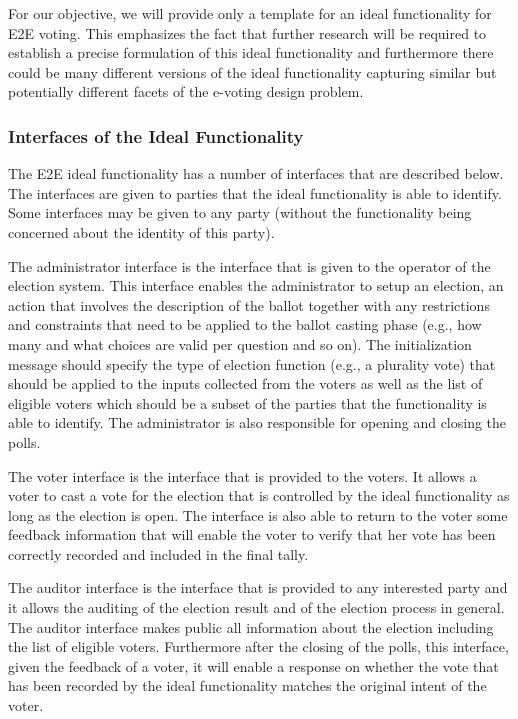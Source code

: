 For our objective, we will provide only a template for an ideal
functionality for E2E voting. This emphasizes the fact that further
research will be required to establish a precise formulation of this
ideal functionality and furthermore there could be many different
versions of the ideal functionality capturing similar but potentially
different facets of the e-voting design problem.

\subsubsection{Interfaces of the Ideal Functionality}

The E2E ideal functionality has a number of interfaces that are
described below. The interfaces are given to parties that the ideal
functionality is able to identify. Some interfaces may be given to any
party (without the functionality being concerned about the identity of
this party).

The administrator interface is the interface that is given to the
operator of the election system. This interface enables the
administrator to setup an election, an action that involves the
description of the ballot together with any restrictions and
constraints that need to be applied to the ballot casting phase (e.g.,
how many and what choices are valid per question and so on). The
initialization message should specify the type of election function
(e.g., a plurality vote) that should be applied to the inputs
collected from the voters as well as the list of eligible voters which
should be a subset of the parties that the functionality is able to
identify. The administrator is also responsible for opening and
closing the polls.

The voter interface is the interface that is provided to the
voters. It allows a voter to cast a vote for the election that is
controlled by the ideal functionality as long as the election is
open. The interface is also able to return to the voter some feedback
information that will enable the voter to verify that her vote has
been correctly recorded and included in the final tally.

The auditor interface is the interface that is provided to any
interested party and it allows the auditing of the election result and
of the election process in general. The auditor interface makes public
all information about the election including the list of eligible
voters. Furthermore after the closing of the polls, this interface,
given the feedback of a voter, it will enable a response on whether
the vote that has been recorded by the ideal functionality matches the
original intent of the voter.

